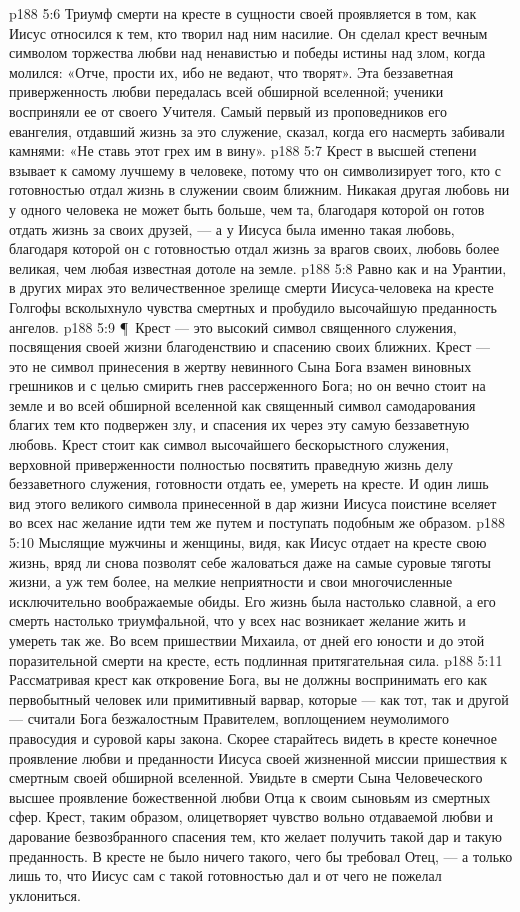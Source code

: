 \vs p188 5:6 Триумф смерти на кресте в сущности своей проявляется в том, как Иисус относился к тем, кто творил над ним насилие. Он сделал крест вечным символом торжества любви над ненавистью и победы истины над злом, когда молился: «Отче, прости их, ибо не ведают, что творят». Эта беззаветная приверженность любви передалась всей обширной вселенной; ученики восприняли ее от своего Учителя. Самый первый из проповедников его евангелия, отдавший жизнь за это служение, сказал, когда его насмерть забивали камнями: «Не ставь этот грех им в вину».
\vs p188 5:7 Крест в высшей степени взывает к самому лучшему в человеке, потому что он символизирует того, кто с готовностью отдал жизнь в служении своим ближним. Никакая другая любовь ни у одного человека не может быть больше, чем та, благодаря которой он готов отдать жизнь за своих друзей, --- а у Иисуса была именно такая любовь, благодаря которой он с готовностью отдал жизнь за врагов своих, любовь более великая, чем любая известная дотоле на земле.
\vs p188 5:8 Равно как и на Урантии, в других мирах это величественное зрелище смерти Иисуса\hyp{}человека на кресте Голгофы всколыхнуло чувства смертных и пробудило высочайшую преданность ангелов.
\vs p188 5:9 \P\ Крест --- это высокий символ священного служения, посвящения своей жизни благоденствию и спасению своих ближних. Крест --- это не символ принесения в жертву невинного Сына Бога взамен виновных грешников и с целью смирить гнев рассерженного Бога; но он вечно стоит на земле и во всей обширной вселенной как священный символ самодарования благих тем кто подвержен злу, и спасения их через эту самую беззаветную любовь. Крест стоит как символ высочайшего бескорыстного служения, верховной приверженности полностью посвятить праведную жизнь делу беззаветного служения, готовности отдать ее, умереть на кресте. И один лишь вид этого великого символа принесенной в дар жизни Иисуса поистине вселяет во всех нас желание идти тем же путем и поступать подобным же образом.
\vs p188 5:10 Мыслящие мужчины и женщины, видя, как Иисус отдает на кресте свою жизнь, вряд ли снова позволят себе жаловаться даже на самые суровые тяготы жизни, а уж тем более, на мелкие неприятности и свои многочисленные исключительно воображаемые обиды. Его жизнь была настолько славной, а его смерть настолько триумфальной, что у всех нас возникает желание жить и умереть так же. Во всем пришествии Михаила, от дней его юности и до этой поразительной смерти на кресте, есть подлинная притягательная сила.
\vs p188 5:11 Рассматривая крест как откровение Бога, вы не должны воспринимать его как первобытный человек или примитивный варвар, которые --- как тот, так и другой --- считали Бога безжалостным Правителем, воплощением неумолимого правосудия и суровой кары закона. Скорее старайтесь видеть в кресте конечное проявление любви и преданности Иисуса своей жизненной миссии пришествия к смертным своей обширной вселенной. Увидьте в смерти Сына Человеческого высшее проявление божественной любви Отца к своим сыновьям из смертных сфер. Крест, таким образом, олицетворяет чувство вольно отдаваемой любви и дарование безвозбранного спасения тем, кто желает получить такой дар и такую преданность. В кресте не было ничего такого, чего бы требовал Отец, --- а только лишь то, что Иисус сам с такой готовностью дал и от чего не пожелал уклониться.

